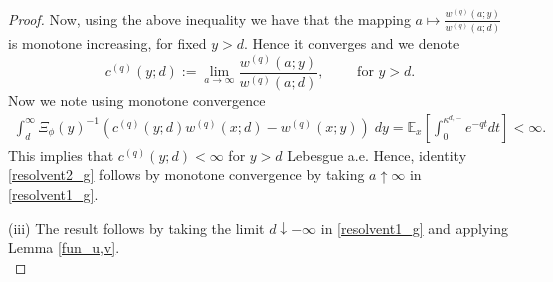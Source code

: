 \documentclass[12pt,reqno]{amsart}
\newcommand{\blue}{\textcolor[rgb]{0.00,0.00,1.00}}
\theoremstyle{definition}
\theoremstyle{remark}
\newcommand{\e}{\mathbb{E}}
\newcommand{\ind}{\mathbf{1}}
\begin{document}
\begin{proof}
 Now, using the above inequality
we have that the mapping $a\mapsto\frac{w^{(q)}(a;y)}{w^{(q)}(a;d)}$ is monotone increasing, for fixed $y>d$. Hence it converges and we denote 
\[
c^{(q)}(y;d):=\lim_{a\to\infty}\frac{w^{(q)}(a;y)}{w^{(q)}(a;d)},\qquad\text{ for $y>d$.}
\]
Now we note using monotone convergence 
\begin{align*}
\int_d^\infty  \Xi_{\phi}(y)^{-1} \left(c^{(q)}(y;d)w^{(q)}(x;d)-w^{(q)}(x;y)\right)\;dy=\e_x\left[\int_0^{\kappa^{d,-}}e^{-qt}dt\right]<\infty.
\end{align*}
This implies that $c^{(q)}(y;d)<\infty$ for $y>d$ Lebesgue a.e. Hence, identity \eqref{resolvent2_g} follows by monotone convergence by taking $a\uparrow\infty$ in \eqref{resolvent1_g}.

(iii) 
The result follows by taking the limit $d\downarrow-\infty$ in \eqref{resolvent1_g} and applying Lemma \ref{fun_u,v}.\\
\end{proof}
\end{document}
